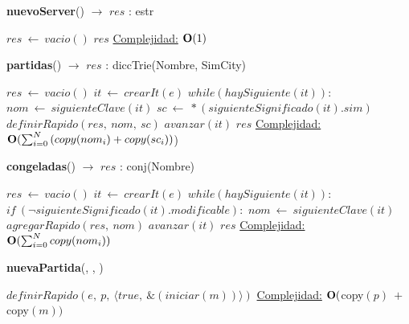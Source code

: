 \begin{Algoritmos}

    \begin{algorithm}[H]{\textbf{nuevoServer}() $\to$ $res$ : estr}
        \begin{algorithmic}[1]
            \State $res\ \gets\ vacio()$
            \State \Return $res$
            \medskip
            \Statex \underline{Complejidad:} $\bold{O}(1)$
        \end{algorithmic}
    \end{algorithm}

    \begin{algorithm}[H]{\textbf{partidas}() $\to$ $res$ : diccTrie(Nombre, SimCity)}
        \begin{algorithmic}[1]
            \State $res\ \gets\ vacio()$
            \State $it\ \gets\ crearIt(e)$
            \State $while(haySiguiente(it)):$
            \State \indent $nom\ \gets\ siguienteClave(it)$
            \State \indent $sc\ \gets\ *(siguienteSignificado(it).sim)$
            \State \indent $definirRapido(res,\ nom,\ sc)$
            \State \indent $avanzar(it)$ 
            \State \Return $res$
            \medskip
            \Statex \underline{Complejidad:} $\bold{O}(\sum_{i = 0}^{N}{(copy(nom_i) + copy(sc_i))}$)
        \end{algorithmic}
    \end{algorithm}

    \begin{algorithm}[H]{\textbf{congeladas}() $\to$ $res$ : conj(Nombre)}
        \begin{algorithmic}[1]
            \State $res\ \gets\ vacio()$
            \State $it\ \gets\ crearIt(e)$
            \State $while(haySiguiente(it)):$
            \State \indent $if\ (\neg siguienteSignificado(it).modificable):$
            \State \indent \indent $nom\ \gets\ siguienteClave(it)$
            \State \indent \indent $agregarRapido(res,\ nom)$
            \State \indent $avanzar(it)$ 
            \State \Return $res$
            \medskip
            \Statex \underline{Complejidad:} $\bold{O}(\sum_{i = 0}^{N}{copy(nom_i)})$
        \end{algorithmic}
    \end{algorithm}

    \begin{algorithm}[H]{\textbf{nuevaPartida}(, , )}
        \begin{algorithmic}[1]
            \State $definirRapido(e,\ p,\ \langle true,\ \&(iniciar(m))\rangle )$ 
            \medskip
            \Statex \underline{Complejidad:} $\bold{O}($copy$(p)\ +\ $copy$(m))$
        \end{algorithmic}
    \end{algorithm}


\end{Algoritmos}
